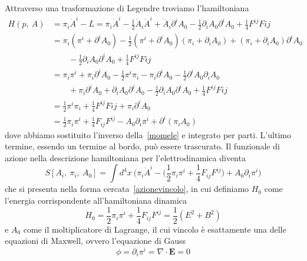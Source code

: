     Attraverso una trasformazione di Legendre troviamo l'hamiltoniana  
    \begin{equation*}
    \begin{aligned}
        H(p, ~A) & = \pi_i \dot A^i - L = \pi_i \dot A^i - \frac{1}{2} \dot A_i \dot A^i + \dot A_i \partial^i A_0 - \frac{1}{2} \partial_i A_0 \partial^i A_0 + \frac{1}{4} F^{ij} F{ij}  \\ & = \pi_i (\pi^i + \partial^i A_0) - \frac{1}{2} (\pi^i + \partial^i A_0) (\pi_i + \partial_i A_0) + (\pi_i + \partial_i A_0)\partial^i A_0 \\ & \qquad - \frac{1}{2} \partial_i A_0 \partial^i A_0 + \frac{1}{4} F^{ij} F{ij} \\ & = \pi_i \pi^i + \pi_i \partial^i A_0 - \frac{1}{2}
        \pi^i \pi_i - \pi_i \partial^i A_0 - \frac{1}{2} \partial^i A_0 \partial_i A_0 \\ & \qquad + \pi_i \partial^i A_0 + \partial_i A_0 \partial^i A_0 - \frac{1}{2} \partial_i A_0 \partial^i A_0 + \frac{1}{4} F^{ij} F{ij} \\ & = \frac{1}{2} \pi^i \pi_i + \frac{1}{4} F^{ij} F{ij} + \pi_i \partial^i A_0 \\ & = \frac{1}{2} \pi_i \pi^i + \frac{1}{4} F_{ij} F^{ij} - A_0 \partial_i \pi^i + \partial^i (\pi_i A_0)
    \end{aligned}
    \end{equation*}
    dove abbiamo sostituito l'inverso della~\eqref{momele} e integrato per parti. L'ultimo termine, essendo un termine al bordo, può essere trascurato. Il funzionale di azione nella descrizione hamiltoniana per l'elettrodinamica diventa
\begin{equation}
    S[A_i, ~\pi_i, ~A_0] = \int d^4 x ~ \Big ( \pi_i \dot A^i - \Big ( \frac{1}{2} \pi_i \pi^i + \frac{1}{4} F_{ij} F^{ij} \Big) + A_0 \partial_i \pi^i \Big)
\end{equation}
    che si presenta nella forma cercata~\eqref{azionevincolo}, in cui definiamo $H_0$ come l'energia corrispondente all'hamiltoniana dinamica 
\begin{equation*}
    H_0 = \frac{1}{2} \pi_i \pi^i + \frac{1}{4} F_{ij} F^{ij} = \frac{1}{2} (E^2 + B^2)
\end{equation*}
    e $A_0$ come il moltiplicatore di Lagrange, il cui vincolo è esattamente una delle equazioni di Maxwell, ovvero l'equazione di Gauss
\begin{equation*}
    \phi = \partial_i \pi^i = \nabla \cdot \mathbf E = 0
\end{equation*}

